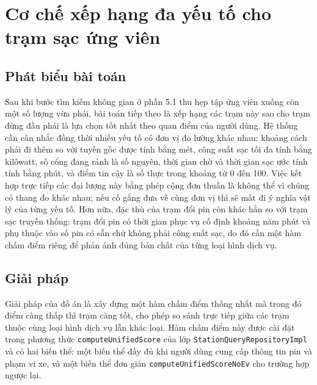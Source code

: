 \documentclass[../Main.tex]{subfiles}
\begin{document}
\section{Cơ chế xếp hạng đa yếu tố cho trạm sạc ứng viên}
\label{section:5.2}

\subsection{Phát biểu bài toán}

Sau khi bước tìm kiếm không gian ở phần 5.1 thu hẹp tập ứng viên xuống còn một số lượng vừa phải, bài toán tiếp theo là xếp hạng các trạm này sao cho trạm đứng đầu phải là lựa chọn tốt nhất theo quan điểm của người dùng. Hệ thống cần cân nhắc đồng thời nhiều yếu tố có đơn vị đo lường khác nhau: khoảng cách phải đi thêm so với tuyến gốc được tính bằng mét, công suất sạc tối đa tính bằng kilôwatt, số cổng đang rảnh là số nguyên, thời gian chờ và thời gian sạc ước tính tính bằng phút, và điểm tin cậy là số thực trong khoảng từ 0 đến 100. Việc kết hợp trực tiếp các đại lượng này bằng phép cộng đơn thuần là không thể vì chúng có thang đo khác nhau; nếu cố gắng đưa về cùng đơn vị thì sẽ mất đi ý nghĩa vật lý của từng yếu tố. Hơn nữa, đặc thù của trạm đổi pin còn khác hẳn so với trạm sạc truyền thống: trạm đổi pin có thời gian phục vụ cố định khoảng năm phút và phụ thuộc vào số pin có sẵn chứ không phải công suất sạc, do đó cần một hàm chấm điểm riêng để phản ánh đúng bản chất của từng loại hình dịch vụ.

\subsection{Giải pháp}

Giải pháp của đồ án là xây dựng một hàm chấm điểm thống nhất mà trong đó điểm càng thấp thì trạm càng tốt, cho phép so sánh trực tiếp giữa các trạm thuộc cùng loại hình dịch vụ lẫn khác loại. Hàm chấm điểm này được cài đặt trong phương thức \texttt{computeUnifiedScore} của lớp \texttt{StationQueryRepositoryImpl} và có hai biến thể: một biến thể đầy đủ khi người dùng cung cấp thông tin pin và phạm vi xe, và một biến thể đơn giản \texttt{computeUnifiedScoreNoEv} cho trường hợp ngược lại.
\end{document}
